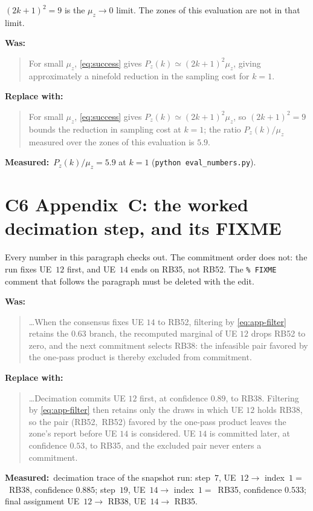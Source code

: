 \documentclass[10pt]{article}
\newcommand{\Was}{\par\smallskip\noindent\textbf{\textcolor{red!70!black}{Was:}}\par\nopagebreak}
\newcommand{\Now}{\par\smallskip\noindent\textbf{\textcolor{green!35!black}{Replace with:}}\par\nopagebreak}
\newcommand{\Why}{\par\smallskip\noindent\textbf{Measured:}\ }
\begin{document}
$(2k+1)^2=9$ is the $\mu_z\to0$ limit. The zones of this evaluation are not
in that limit.

\Was
\begin{quote}
For small $\mu_z$, \eqref{eq:success} gives $P_z(k)\simeq(2k+1)^2\mu_z$,
giving approximately a ninefold reduction in the sampling cost for $k=1$.
\end{quote}

\Now
\begin{quote}
For small $\mu_z$, \eqref{eq:success} gives $P_z(k)\simeq(2k+1)^2\mu_z$, so
$(2k+1)^2=9$ bounds the reduction in sampling cost at $k=1$; the ratio
$P_z(k)/\mu_z$ measured over the zones of this evaluation is $5.9$.
\end{quote}

\Why $P_z(k)/\mu_z=5.9$ at $k=1$ (\texttt{python eval\_numbers.py}).

\section*{C6 \quad Appendix~C: the worked decimation step, and its FIXME}

Every number in this paragraph checks out. The commitment order does not:
the run fixes UE~$12$ first, and UE~$14$ ends on RB35, not RB52. The
\verb|% FIXME| comment that follows the paragraph must be deleted with the
edit.

\Was
\begin{quote}
\ldots When the consensus fixes UE $14$ to RB52, filtering by
\eqref{eq:app-filter} retains the $0.63$ branch, the recomputed marginal of
UE $12$ drops RB52 to zero, and the next commitment selects RB38: the
infeasible pair favored by the one-pass product is thereby excluded from
commitment.
\end{quote}

\Now
\begin{quote}
\ldots Decimation commits UE $12$ first, at confidence $0.89$, to RB38.
Filtering by \eqref{eq:app-filter} then retains only the draws in which UE
$12$ holds RB38, so the pair (RB52,~RB52) favored by the one-pass product
leaves the zone's report before UE $14$ is considered. UE $14$ is committed
later, at confidence $0.53$, to RB35, and the excluded pair never enters a
commitment.
\end{quote}

\Why decimation trace of the snapshot run: step~$7$, UE~$12\rightarrow$
index~$1=$~RB38, confidence $0.885$; step~$19$, UE~$14\rightarrow$
index~$1=$~RB35, confidence $0.533$; final assignment UE~$12\rightarrow$
RB38, UE~$14\rightarrow$ RB35.
\end{document}
